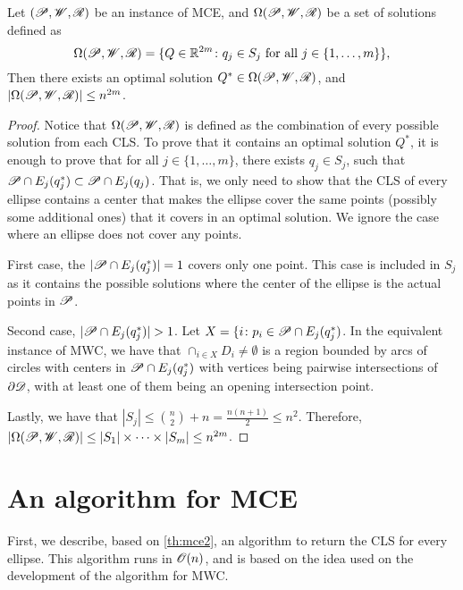 \begin{theorem}\label{th:mce2}
	Let $(\mathscr{P}, \mathscr{W}, \mathscr{R})$ be an instance of MCE, and $\Omega(\mathscr{P}, \mathscr{W}, \mathscr{R})$ be a set of solutions defined as 
	\begin{equation*}\label{eq:omega2}
		\Omega(\mathscr{P}, \mathscr{W}, \mathscr{R}) = \{Q\in \mathbb{R}^{2m} \colon q_j \in S_j \textnormal{ for all } j\in\{1, \dots, m\}\},
	\end{equation*}
	Then there exists an optimal solution $Q^*\in \Omega(\mathscr{P}, \mathscr{W}, \mathscr{R})$, and $|\Omega(\mathscr{P}, \mathscr{W}, \mathscr{R})|\le n^{2m}$.
\end{theorem}
\begin{proof}
		Notice that $\Omega(\mathscr{P}, \mathscr{W}, \mathscr{R})$ is defined as the combination of every possible solution from each CLS. To prove that it contains an optimal solution $Q^*$, it is enough to prove that for all $j\in\{1, \dots, m\}$, there exists $q_j\in S_j$, such that $\mathscr{P} \cap E_j(q_j^*) \subset \mathscr{P} \cap E_j(q_j)$. That is, we only need to show that the CLS of every ellipse contains a center that makes the ellipse cover the same points (possibly some additional ones) that it covers in an optimal solution.
		We ignore the case where an ellipse does not cover any points.
		
		First case, the $|\mathscr{P} \cap E_j(q_j^*)|=1$ covers only one point. This case is included in $S_j$ as it contains the possible solutions where the center of the ellipse is the actual points in $\mathscr{P}$.
		
		Second case, $|\mathscr{P} \cap E_j(q_j^*)| > 1$. Let $X = \{i \colon p_i \in \mathscr{P} \cap E_j(q_j^*)$. In the equivalent instance of MWC, we have that $\cap_{i\in X} D_i \neq \emptyset$ is a region bounded by arcs of circles with centers in $\mathscr{P} \cap E_j(q_j^*)$ with vertices being pairwise intersections of $\partial \mathscr{D}$, with at least one of them being an opening intersection point.
		
		Lastly, we have that $|S_j| \le \binom{n}{2} + n = \frac{n(n+1)}{2} \le n^2$. Therefore,
		$|\Omega(\mathscr{P}, \mathscr{W}, \mathscr{R})| \le |S_1|\times \dots \times |S_m| \le n^{2m}$.
\end{proof}

\section{An algorithm for MCE}

First, we describe, based on \autoref{th:mce2}, an algorithm to return the CLS for every ellipse. This algorithm runs in $\mathscr{O}(n)$, and is based on the idea used on the development of the algorithm for MWC.


